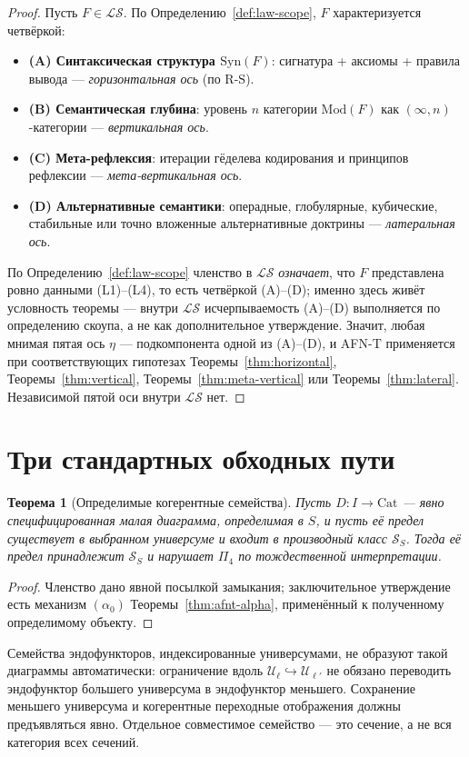 \documentclass[11pt]{article}
\theoremstyle{plain}
\newtheorem{theorem}{Теорема}[section]
\theoremstyle{definition}
\newcommand{\RS}{\mathrm{R\text{-}S}}
\newcommand{\cS}{\mathcal{S}}
\newcommand{\cL}{\mathcal{L}}
\newcommand{\Cat}{\mathrm{Cat}}
\newcommand{\Syn}{\mathrm{Syn}}
\newcommand{\Mod}{\mathrm{Mod}}
\newcommand{\cU}{\mathcal{U}}
\begin{document}
\begin{proof}
Пусть $F \in \cL\cS$. По Определению~\ref{def:law-scope}, $F$ характеризуется четвёркой:
\begin{itemize}
\item \textbf{(A) Синтаксическая структура $\Syn(F)$}: сигнатура + аксиомы + правила вывода --- \emph{горизонтальная ось} (по $\RS$).
\item \textbf{(B) Семантическая глубина}: уровень $n$ категории $\Mod(F)$ как $(\infty, n)$-категории --- \emph{вертикальная ось}.
\item \textbf{(C) Мета-рефлексия}: итерации гёделева кодирования и принципов рефлексии --- \emph{мета-вертикальная ось}.
\item \textbf{(D) Альтернативные семантики}: операдные, глобулярные, кубические, стабильные или точно вложенные альтернативные доктрины --- \emph{латеральная ось}.
\end{itemize}
По Определению~\ref{def:law-scope} членство в $\cL\cS$ \emph{означает}, что $F$ представлена ровно данными (L1)--(L4), то есть четвёркой (A)--(D); именно здесь живёт условность теоремы --- внутри $\cL\cS$ исчерпываемость (A)--(D) выполняется по определению скоупа, а не как дополнительное утверждение. Значит, любая мнимая пятая ось $\eta$ — подкомпонента одной из (A)--(D), и AFN-T применяется при соответствующих гипотезах Теоремы~\ref{thm:horizontal}, Теоремы~\ref{thm:vertical}, Теоремы~\ref{thm:meta-vertical} или Теоремы~\ref{thm:lateral}. Независимой пятой оси внутри $\cL\cS$ нет.
\end{proof}

\section{Три стандартных обходных пути}\label{sec:bypass}

\begin{theorem}[Определимые когерентные семейства]\label{thm:universe}
Пусть $D : I \to \Cat$ — явно специфицированная малая диаграмма, определимая в $S$, и пусть её предел существует в выбранном универсуме и входит в производный класс $\cS_S$. Тогда её предел принадлежит $\cS_S$ и нарушает $\Pi_4$ по тождественной интерпретации.
\end{theorem}
\begin{proof}
Членство дано явной посылкой замыкания; заключительное утверждение есть механизм $(\alpha_0)$ Теоремы~\ref{thm:afnt-alpha}, применённый к полученному определимому объекту.
\end{proof}
Семейства эндофункторов, индексированные универсумами, не образуют такой диаграммы автоматически: ограничение вдоль $\cU_\ell \hookrightarrow \cU_{\ell'}$ не обязано переводить эндофунктор большего универсума в эндофунктор меньшего. Сохранение меньшего универсума и когерентные переходные отображения должны предъявляться явно. Отдельное совместимое семейство — это сечение, а не вся категория всех сечений.
\end{document}
